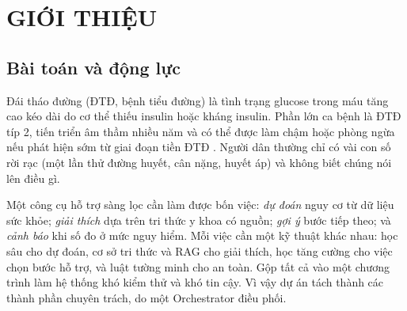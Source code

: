 \documentclass[12pt,a4paper]{report}
\begin{document}
\listoffigures
\clearpage
\listoftables
\clearpage

\setcounter{page}{1}

\chapter{GIỚI THIỆU}

\section{Bài toán và động lực}
Đái tháo đường (ĐTĐ, bệnh tiểu đường) là tình trạng glucose trong máu tăng cao kéo dài do cơ thể thiếu insulin hoặc kháng insulin. Phần lớn ca bệnh là ĐTĐ típ 2, tiến triển âm thầm nhiều năm và có thể được làm chậm hoặc phòng ngừa nếu phát hiện sớm từ giai đoạn tiền ĐTĐ \cite{ada2025,dpp2002}. Người dân thường chỉ có vài con số rời rạc (một lần thử đường huyết, cân nặng, huyết áp) và không biết chúng nói lên điều gì.

Một công cụ hỗ trợ sàng lọc cần làm được bốn việc: \emph{dự đoán} nguy cơ từ dữ liệu sức khỏe; \emph{giải thích} dựa trên tri thức y khoa có nguồn; \emph{gợi ý} bước tiếp theo; và \emph{cảnh báo} khi số đo ở mức nguy hiểm. Mỗi việc cần một kỹ thuật khác nhau: học sâu cho dự đoán, cơ sở tri thức và RAG cho giải thích, học tăng cường cho việc chọn bước hỗ trợ, và luật tường minh cho an toàn. Gộp tất cả vào một chương trình làm hệ thống khó kiểm thử và khó tin cậy. Vì vậy dự án tách thành các thành phần chuyên trách, do một Orchestrator điều phối.
\end{document}
